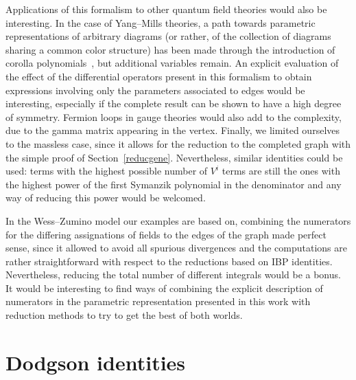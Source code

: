 \documentclass[pdftex]{sigma}
\numberwithin{equation}{section}
\begin{document}
Applications of this formalism to other quantum field theories would also be interesting. In the case of Yang--Mills
theories, a path towards parametric representations of arbitrary diagrams (or rather, of the collection of diagrams sharing
a common color structure) has been made through the introduction of corolla polynomials~\cite{KrSaSu12,KrYe12}, but
additional variables remain. An explicit evaluation of the effect of the differential operators present in this formalism
to obtain expressions involving only the parameters associated to edges would be interesting, especially if the complete
result can be shown to have a high degree of symmetry. Fermion loops in gauge theories would also add to the complexity,
due to the gamma matrix appearing in the vertex. Finally, we limited ourselves to the massless case, since it allows for
the reduction to the completed graph with the simple proof of Section~\ref{reducgene}. Nevertheless, similar identities
could be used: terms with the highest possible number of $V^i$ terms are still the ones with the highest power of the
first Symanzik polynomial in the denominator and any way of reducing this power would be welcomed.

In the Wess--Zumino model our examples are based on, combining the numerators for the differing assignations of fields to
the edges of the graph made perfect sense, since it allowed to avoid all spurious divergences and the computations are
rather straightforward with respect to the reductions based on IBP identities. Nevertheless, reducing the
total number of different integrals would be a bonus. It would be interesting to find ways of combining the
explicit description of numerators in the parametric representation presented in this work with reduction methods to try to
get the best of both worlds.

\appendix
\section{Dodgson identities}\label{polyn}
\end{document}

